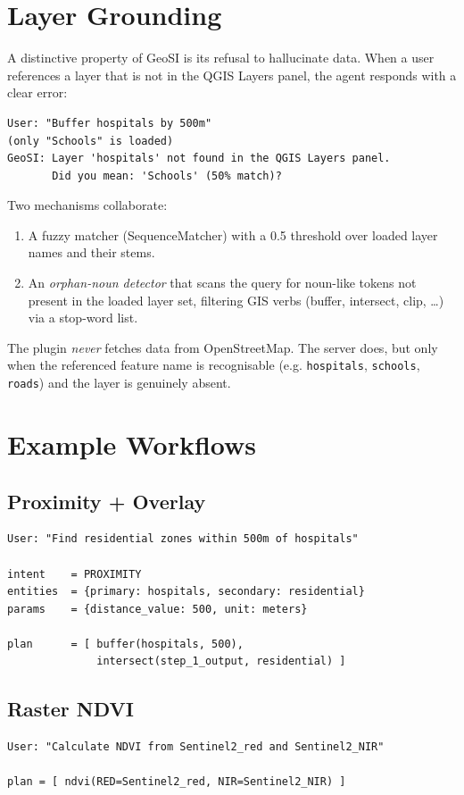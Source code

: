 \documentclass[11pt,a4paper]{article}
\begin{document}
\section{Layer Grounding}
A distinctive property of GeoSI is its refusal to hallucinate data.
When a user references a layer that is not in the QGIS Layers panel,
the agent responds with a clear error:
\begin{lstlisting}
User: "Buffer hospitals by 500m"
(only "Schools" is loaded)
GeoSI: Layer 'hospitals' not found in the QGIS Layers panel.
       Did you mean: 'Schools' (50% match)?
\end{lstlisting}
Two mechanisms collaborate:
\begin{enumerate}[leftmargin=*]
  \item A fuzzy matcher (SequenceMatcher) with a 0.5 threshold over
  loaded layer names and their stems.
  \item An \emph{orphan-noun detector} that scans the query for
  noun-like tokens not present in the loaded layer set, filtering GIS
  verbs (buffer, intersect, clip, \ldots) via a stop-word list.
\end{enumerate}
The plugin \emph{never} fetches data from OpenStreetMap. The server
does, but only when the referenced feature name is recognisable
(e.g. \texttt{hospitals}, \texttt{schools}, \texttt{roads}) and the
layer is genuinely absent.

\section{Example Workflows}
\subsection{Proximity + Overlay}
\begin{lstlisting}
User: "Find residential zones within 500m of hospitals"

intent    = PROXIMITY
entities  = {primary: hospitals, secondary: residential}
params    = {distance_value: 500, unit: meters}

plan      = [ buffer(hospitals, 500),
              intersect(step_1_output, residential) ]
\end{lstlisting}

\subsection{Raster NDVI}
\begin{lstlisting}
User: "Calculate NDVI from Sentinel2_red and Sentinel2_NIR"

plan = [ ndvi(RED=Sentinel2_red, NIR=Sentinel2_NIR) ]
\end{lstlisting}
\end{document}

